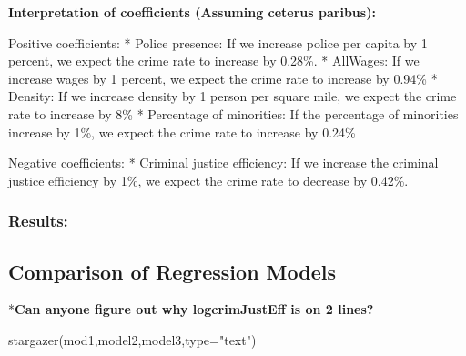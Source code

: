 \documentclass[]{article}
\newenvironment{Shaded}{}{}
\newcommand{\DataTypeTok}[1]{#1}
\newcommand{\KeywordTok}[1]{\textcolor[rgb]{0.00,0.00,1.00}{#1}}
\newcommand{\NormalTok}[1]{#1}
\newcommand{\StringTok}[1]{\textcolor[rgb]{0.00,0.50,0.50}{#1}}
\begin{document}
\textbf{Interpretation of coefficients (Assuming ceterus paribus):}

Positive coefficients: * Police presence: If we increase police per
capita by 1 percent, we expect the crime rate to increase by 0.28\%. *
AllWages: If we increase wages by 1 percent, we expect the crime rate to
increase by 0.94\% * Density: If we increase density by 1 person per
square mile, we expect the crime rate to increase by 8\% * Percentage of
minorities: If the percentage of minorities increase by 1\%, we expect
the crime rate to increase by 0.24\%

Negative coefficients: * Criminal justice efficiency: If we increase the
criminal justice efficiency by 1\%, we expect the crime rate to decrease
by 0.42\%.

\hypertarget{results}{%
\subsubsection{Results:}\label{results}}

\hypertarget{comparison-of-regression-models}{%
\subsection{Comparison of Regression
Models}\label{comparison-of-regression-models}}

*\textbf{Can anyone figure out why logcrimJustEff is on 2 lines?}

\begin{Shaded}
\begin{Highlighting}[]
\KeywordTok{stargazer}\NormalTok{(mod1,model2,model3,}\DataTypeTok{type=}\StringTok{"text"}\NormalTok{)}
\end{Highlighting}
\end{Shaded}
\end{document}
